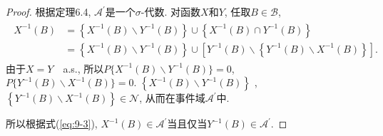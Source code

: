 \documentclass[UTF8, a4paper]{article}
\begin{document}
\begin{proof}
    根据定理6.4, \(\mathcal{A}^\prime\)是一个\(\sigma\)-代数.
对函数\(X\)和\(Y\), 
任取\(B\in \mathcal{B}\), 
\begin{align}
\begin{aligned}
    X^{-1}(B) &= \left\{X^{-1}(B) \backslash Y^{-1}(B)\right\} \cup \left\{X^{-1}(B) \cap Y^{-1}(B)\right\} \\
    &= \left\{X^{-1}(B) \backslash Y^{-1}(B)\right\} \cup \left[Y^{-1}(B) \backslash \left\{Y^{-1}(B) \backslash X^{-1}(B)\right\}\right] .
\end{aligned} \label{eq:9-3}
\end{align}
由于\(X = Y\quad\)a.s., 所以\(P\{X^{-1}(B) \backslash Y^{-1}(B)\} = 0\), \(P\{Y^{-1}(B) \backslash X^{-1}(B)\} = 0\).
\(\left\{X^{-1}(B) \backslash Y^{-1}(B)\right\}\) , \(\left\{Y^{-1}(B) \backslash X^{-1}(B)\right\}  \in \mathcal{N}\), 从而在事件域\(\mathcal{A}^\prime\)中.

所以根据式(\ref{eq:9-3}), \(X^{-1}(B) \in \mathcal{A}^\prime\)当且仅当\(Y^{-1}(B) \in \mathcal{A}^\prime\).
\end{proof}
\end{document}
